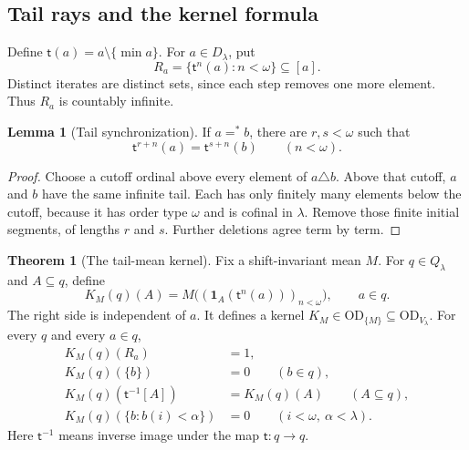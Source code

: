 \documentclass[11pt,letterpaper]{article}
\theoremstyle{definition}
\newtheorem{theorem}[definition]{Theorem}
\newtheorem{lemma}[definition]{Lemma}
\newcommand{\OD}{\mathrm{OD}}
\newcommand{\ODlam}{\OD_{V_\lambda}}
\newcommand{\Dlam}{D_\lambda}
\newcommand{\Qlam}{Q_\lambda}
\newcommand{\ind}{\mathbf 1}
\newcommand{\tail}{\mathsf t}
\begin{document}
\subsection{Tail rays and the kernel formula}

Define $\tail(a)=a\setminus\{\min a\}$. For $a\in\Dlam$, put
\[
 R_a=\{\tail^n(a):n<\omega\}\subseteq[a].
\]
Distinct iterates are distinct sets, since each step removes one more element. Thus $R_a$ is countably infinite.

\begin{lemma}[Tail synchronization]\label{lem:sync}
If $a=^*b$, there are $r,s<\omega$ such that
\begin{equation}\label{eq:sync}
 \tail^{r+n}(a)=\tail^{s+n}(b)\qquad(n<\omega).
\end{equation}
\end{lemma}

\begin{proof}
Choose a cutoff ordinal above every element of $a\triangle b$. Above that cutoff, $a$ and $b$ have the same infinite tail. Each has only finitely many elements below the cutoff, because it has order type $\omega$ and is cofinal in $\lambda$. Remove those finite initial segments, of lengths $r$ and $s$. Further deletions agree term by term.
\end{proof}

\begin{theorem}[The tail-mean kernel]\label{thm:tailkernel}
Fix a shift-invariant mean $M$. For $q\in\Qlam$ and $A\subseteq q$, define
\begin{equation}\label{eq:kernel}
 K_M(q)(A)=M\bigl((\ind_A(\tail^n(a)))_{n<\omega}\bigr),
 \qquad a\in q.
\end{equation}
The right side is independent of $a$. It defines a kernel $K_M\in\OD_{\{M\}}\subseteq\ODlam$. For every $q$ and every $a\in q$,
\begin{align}
 K_M(q)(R_a)&=1,\label{eq:raymass}\\
 K_M(q)(\{b\})&=0\qquad(b\in q),\label{eq:atomzero}\\
 K_M(q)(\tail^{-1}[A])&=K_M(q)(A)\qquad(A\subseteq q),\label{eq:deleteinv}\\
 K_M(q)(\{b:b(i)<\alpha\})&=0\qquad(i<\omega,\ \alpha<\lambda).
 \label{eq:tailcdf}
\end{align}
Here $\tail^{-1}$ means inverse image under the map $\tail:q\to q$.
\end{theorem}
\end{document}
